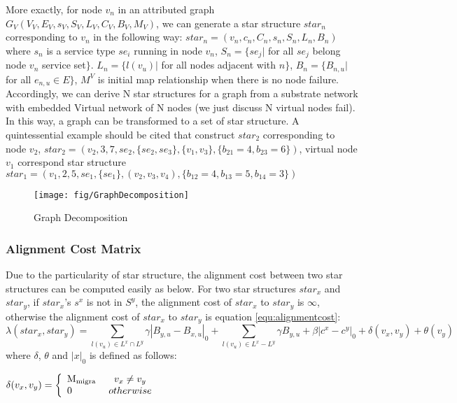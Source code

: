 More exactly, for node $v_n$ in an attributed graph  $G_V (V_V,E_V,s_V,S_V,L_V,C_V,B_V,M_V)$, we can generate a star structure $star_n$ corresponding to $v_n$ in the following way: $star_n=(v_n,c_n,C_n,s_n,S_n,L_n,B_n)$ where $s_n$ is a service type $se_i$ running in node $v_n$, $S_n=\{se_{j}|$ for all $se_j$ belong node $v_n$ service set$\}$.  $L_n=\{l(v_u)|$ for all nodes  adjacent with $n\}$, $B_n=\{B_{n,u}| $for all $e_{n,u}\in E\}$, $M^V$ is initial map relationship when there is no node failure. Accordingly, we can derive N star structures for a graph from a substrate network with embedded Virtual network of N nodes (we just discuss N virtual nodes fail). In this way, a graph can be transformed to a set of star structure. A quintessential example should be cited that construct $star_2$ corresponding to node $v_2$, $star_2=(v_2,3,7,se_2,\{se_2,se_3\},\{v_1,v_3\},\{b_{21}=4,b_{23}=6\})$, virtual node $v_1$ correspond star structure $star_1=(v_1,2,5,se_1,\{se_1\},(v_2,v_3,v_4),\{b_{12}=4,b_{13}=5,b_{14}=3\})$
\begin{figure}
\centering
\texttt{[image: fig/GraphDecomposition]}\\
\caption{Graph Decomposition}\label{fig:GraphDecomposition}
\end{figure}
\subsubsection{Alignment Cost Matrix}


Due to the particularity of star structure, the alignment cost between two star structures can be computed easily as below. For two star structures $star_x$ and $star_y$, if $star_x$'s $s^x$ is not in $S^y$, the alignment cost of $star_x$ to $star_y$ is $\infty$, otherwise the alignment cost of $star_x$ to $star_y$ is equation \ref{equ:alignmentcost}:
\begin{equation}\label{equ:alignmentcost}
\lambda(star_x,star_y)=\sum\limits_{l(v_u)\in L^x \cap L^y}\gamma|B_{y,u}-B_{x,u}|_0+\sum\limits_{l(v_u)\in L^x - L^y}\gamma B_{y,u}+\beta|c^x-c^y|_0+ \delta(v_x,v_y)+\theta(v_y)
\end{equation}
where $\delta$, $\theta$ and $|x|_0$ is defined as follows:

$\delta ({v_x},{v_y}) = \left\{ \begin{array}{l}
{\rm{M_{migra}}}\\
0
\end{array} \right.\begin{array}{*{20}{c}}
v_x\neq v_y\\
{otherwise}
\end{array}$

